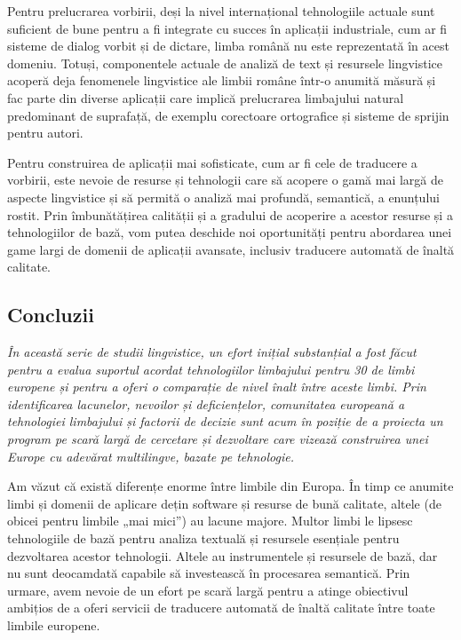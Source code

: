 \begin{multicols}{2}
Pentru prelucrarea vorbirii, deși la nivel internațional tehnologiile actuale sunt suficient de bune pentru a fi integrate cu succes în aplicații industriale, cum ar fi sisteme de dialog vorbit și de dictare, limba română nu este reprezentată în acest domeniu. Totuși, componentele actuale de analiză de text și resursele lingvistice acoperă deja fenomenele lingvistice ale limbii române într-o anumită măsură și fac parte din diverse aplicații care implică prelucrarea limbajului natural predominant de suprafață, de exemplu corectoare ortografice și sisteme de sprijin pentru autori.

Pentru construirea de aplicații mai sofisticate, cum ar fi cele de traducere a vorbirii, este nevoie de resurse și tehnologii care să acopere o gamă mai largă de aspecte lingvistice și să permită o analiză mai profundă, semantică, a enunțului rostit. Prin îmbunătățirea calității și a gradului de acoperire a acestor resurse și a tehnologiilor de bază, vom putea deschide noi oportunități pentru abordarea unei game largi de domenii de aplicații avansate, inclusiv traducere automată de înaltă calitate.

\subsection{Concluzii}

\emph{În această serie de studii lingvistice, un efort inițial substanțial a fost făcut pentru a evalua suportul acordat tehnologiilor limbajului pentru 30 de limbi europene și pentru a oferi o comparație de nivel înalt între aceste limbi. Prin identificarea lacunelor, nevoilor și deficiențelor, comunitatea europeană a tehnologiei limbajului și factorii de decizie sunt acum în poziție de a proiecta un program pe scară largă de cercetare și dezvoltare care vizează construirea unei Europe cu adevărat multilingve, bazate pe tehnologie.}

Am văzut că există diferențe enorme între limbile din Europa. În timp ce anumite limbi și domenii de aplicare dețin software și resurse de bună calitate, altele (de obicei pentru limbile „mai mici”) au lacune majore. Multor limbi le lipsesc tehnologiile de bază pentru analiza textuală și resursele esențiale pentru dezvoltarea acestor tehnologii. Altele au instrumentele și resursele de bază, dar nu sunt deocamdată capabile să investească în procesarea semantică. Prin urmare, avem nevoie de un efort pe scară largă pentru a atinge obiectivul ambițios de a oferi servicii de traducere automată de înaltă calitate între toate limbile europene.


\end{multicols}
